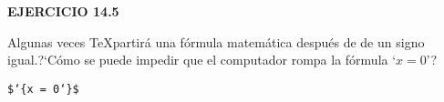 \centerline{\bf EJERCICIO 14.5}

\vskip 12pt

 Algunas veces \TeX partir\'a una f\'ormula matem\'atica despu\'es de de un
signo igual.?`C\'omo se puede impedir que el computador rompa la f\'ormula `$x = 0$'?

\vskip 6pt

 {\tt\$\string\hbox\char`\{x = 0\char`\}\$}

\bye